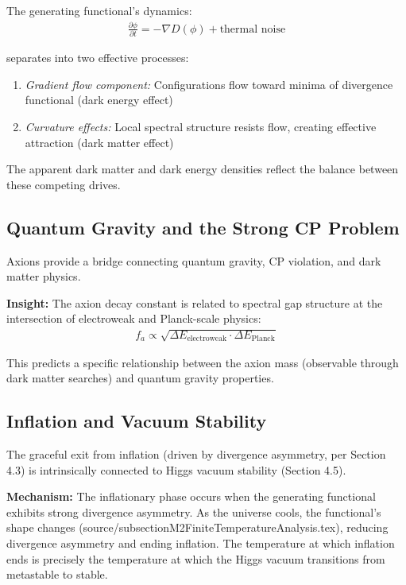 \documentclass[12pt,a4paper]{article}
\begin{document}
The generating functional's dynamics:
\begin{align}
\frac{\partial \phi}{\partial t} = -\nabla D(\phi) + \text{thermal noise}
\end{align}

separates into two effective processes:
\begin{enumerate}
\item \textit{Gradient flow component:} Configurations flow toward minima of divergence functional (dark energy effect)
\item \textit{Curvature effects:} Local spectral structure resists flow, creating effective attraction (dark matter effect)
\end{enumerate}

The apparent dark matter and dark energy densities reflect the balance between these competing drives.

\subsection{Quantum Gravity and the Strong CP Problem}

Axions provide a bridge connecting quantum gravity, CP violation, and dark matter physics.

\textbf{Insight:} The axion decay constant is related to spectral gap structure at the intersection of electroweak and Planck-scale physics:
\begin{align}
f_a \propto \sqrt{\Delta E_{\text{electroweak}} \cdot \Delta E_{\text{Planck}}}
\end{align}

This predicts a specific relationship between the axion mass (observable through dark matter searches) and quantum gravity properties.

\subsection{Inflation and Vacuum Stability}

The graceful exit from inflation (driven by divergence asymmetry, per Section 4.3) is intrinsically connected to Higgs vacuum stability (Section 4.5).

\textbf{Mechanism:} The inflationary phase occurs when the generating functional exhibits strong divergence asymmetry. As the universe cools, the functional's shape changes (source/subsectionM2FiniteTemperatureAnalysis.tex), reducing divergence asymmetry and ending inflation. The temperature at which inflation ends is precisely the temperature at which the Higgs vacuum transitions from metastable to stable.
\end{document}

